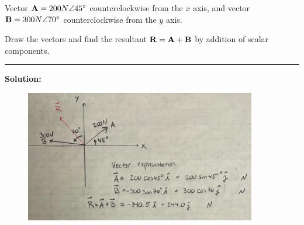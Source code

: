 
Vector ${\bf A} = 200 N \angle 45^\circ$ counterclockwise from the $x$ axis, and vector ${\bf B} = 300 N \angle 70^\circ$ counterclockwise from the $y$ axis.

Draw the vectors and find the resultant ${\bf R} = {\bf A} + {\bf B}$ by addition of scalar components.

\vspace{.5cm}
\rule{\textwidth}{.4pt}
\vspace{.5cm}
\textbf{Solution:}
\begin{figure}[ht!]
  \centering
  \includegraphics[width=0.9\textwidth]{soln.png}
\end{figure}

%
%
